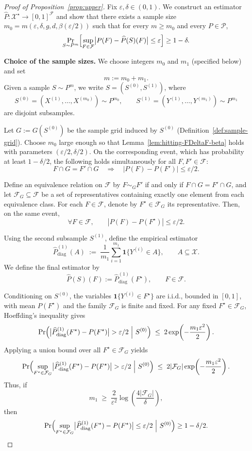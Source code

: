 \documentclass[arxiv]{colt2026}
\newcommand{\X}{\mathcal{X}}
\newcommand{\F}{\mathcal{F}}
\newcommand{\Pc}{\mathcal{P}}
\newcommand{\eps}{\varepsilon}
\newcommand{\diag}{\mathrm{diag}}
\begin{document}
\begin{proof}[Proof of Proposition~\ref{prop:upper}]
Fix $\eps,\delta\in(0,1)$.
We construct an estimator $\widehat P:\X^\star\to[0,1]^{\F}$ and show that there
exists a sample size
$m_0 = m(\eps,\delta,g,d,\beta(\eps/2))$
such that for every $m\ge m_0$ and every $P\in\Pc$,
\[
\Pr_{S\sim P^{m}}
\Bigl[
\sup_{F\in\F}\bigl|P(F)-\widehat P(S)(F)\bigr|\le \eps
\Bigr]\ge 1-\delta.
\]

\medskip
\noindent\textbf{Choice of the sample sizes.}
We choose integers $m_0$ and $m_1$ (specified below) and set
\[
m := m_0+m_1.
\]
Given a sample $S\sim P^{m}$, we write $S=(S^{(0)},S^{(1)})$, where
\[
S^{(0)}=(X^{(1)},\ldots,X^{(m_0)})\sim P^{m_0},
\qquad
S^{(1)}=(Y^{(1)},\ldots,Y^{(m_1)})\sim P^{m_1}
\]
are disjoint subsamples.

Let $G := G(S^{(0)})$ be the sample grid induced by $S^{(0)}$ (Definition~\ref{def:sample-grid}). Choose $m_0$ large enough so that Lemma~\ref{lem:hitting-FDeltaF-beta} holds with
parameters $(\eps/2,\delta/2)$.
On the corresponding event, which has probability at least $1-\delta/2$, the
following holds simultaneously for all $F,F'\in\F$:
\[
F\cap G = F'\cap G
\quad\Longrightarrow\quad
|P(F)-P(F')|\le \eps/2.
\]

Define an equivalence relation on $\F$ by
$F\sim_G F'$ if and only if $F\cap G=F'\cap G$, and let
$\F_G\subseteq\F$ be a set of representatives containing exactly one element from
each equivalence class.
For each $F\in\F$, denote by $F^\star\in\F_G$ its representative.
Then, on the same event,
\begin{equation}\label{eq:rep-approx-prop}
\forall F\in\F,\qquad |P(F)-P(F^\star)|\le \eps/2.
\end{equation}

Using the second subsample $S^{(1)}$, define the empirical estimator
\[
\widehat P_{\diag}^{(1)}(A)
\;:=\;
\frac{1}{m_1}\sum_{i=1}^{m_1}\mathbf 1\{Y^{(i)}\in A\},
\qquad A\subseteq\X.
\]
We define the final estimator by
\[
\widehat P(S)(F):=\widehat P_{\diag}^{(1)}(F^\star),\qquad F\in\F.
\]

Conditioning on $S^{(0)}$, the variables
$\mathbf 1\{Y^{(i)}\in F^\star\}$ are i.i.d., bounded in $[0,1]$,
with mean $P(F^\star)$ and the family $\F_G$ is finite and fixed.
For any fixed $F^\star\in\F_G$, Hoeffding's inequality gives
\[
\Pr\Bigl(
\bigl|\widehat P_{\diag}^{(1)}(F^\star)-P(F^\star)\bigr|>\eps/2
\ \Big|\ S^{(0)}
\Bigr)
\;\le\;
2\exp\!\left(-\frac{m_1\eps^2}{2}\right).
\]
Applying a union bound over all $F^\star\in\F_G$ yields
\[
\Pr\Bigl(
\sup_{F^\star\in\F_G}
\bigl|\widehat P_{\diag}^{(1)}(F^\star)-P(F^\star)\bigr|>\eps/2
\ \Big|\ S^{(0)}
\Bigr)
\;\le\;
2|\F_G|\exp\!\left(-\frac{m_1\eps^2}{2}\right).
\]
Thus, if
\[
m_1
\;\ge\;
\frac{2}{\eps^2}
\log\!\left(\frac{4|\F_G|}{\delta}\right),
\]
then
\begin{equation}\label{eq:finite-est-prop}
\Pr\Bigl(
\sup_{F^\star\in\F_G}
\bigl|\widehat P_{\diag}^{(1)}(F^\star)-P(F^\star)\bigr|
\le \eps/2
\ \Big|\ S^{(0)}
\Bigr)\ge 1-\delta/2.
\end{equation}


\end{proof}
\end{document}
